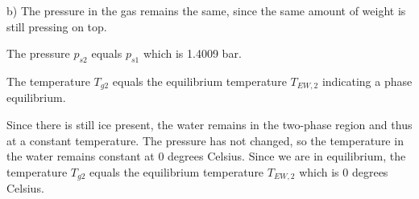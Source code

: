 b) The pressure in the gas remains the same, since the same amount of weight is still pressing on top.

The pressure \( p_{s2} \) equals \( p_{s1} \) which is 1.4009 bar.

The temperature \( T_{g2} \) equals the equilibrium temperature \( T_{EW,2} \) indicating a phase equilibrium.

Since there is still ice present, the water remains in the two-phase region and thus at a constant temperature. The pressure has not changed, so the temperature in the water remains constant at 0 degrees Celsius. Since we are in equilibrium, the temperature \( T_{g2} \) equals the equilibrium temperature \( T_{EW,2} \) which is 0 degrees Celsius.